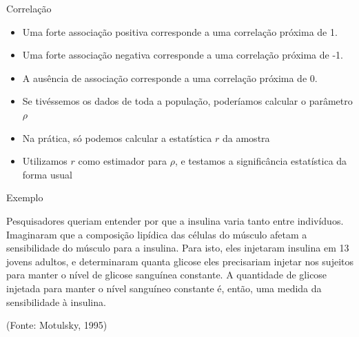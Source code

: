 \documentclass{beamer}
\begin{document}
\begin{frame}{Correlação}
  \begin{block}{}
    \begin{itemize}
    \item Uma forte associação \alert<2>{positiva} corresponde a uma correlação
      próxima de \alert<2>{1}.
    \item Uma forte associação \alert<3>{negativa} corresponde a uma correlação
      próxima de \alert<3>{-1}.
    \item A \alert<4>{ausência} de associação corresponde a uma
      correlação próxima de \alert<4>{0}.
    \end{itemize}
  \end{block}
\end{frame}

\begin{frame}{}
  \begin{itemize}
  \item Se tivéssemos os dados de toda a \alert<1>{população}, poderíamos
    calcular o \alert<1>{parâmetro} $\rho$
  \item Na prática, só podemos calcular a \alert<2>{estatística} $r$ da \alert<2>{amostra}
  \item Utilizamos $r$ como estimador para $\rho$, e testamos a
    significância estatística da forma usual
  \end{itemize}
\end{frame}

\begin{frame}{Exemplo}
 \begin{example}
   Pesquisadores queriam entender por que a insulina varia tanto entre
   indivíduos. Imaginaram que a \alert<2>{composição lipídica} das células do
   músculo afetam a \alert<3>{sensibilidade do músculo para a insulina}. Para
   isto, eles injetaram insulina em 13 jovens adultos, e determinaram
   quanta glicose eles precisariam injetar nos sujeitos para manter o
   nível de glicose sanguínea constante. A quantidade de glicose
   injetada para manter o nível sanguíneo constante é, então, uma
   medida da sensibilidade à insulina.


    (Fonte: Motulsky, 1995)
  \end{example}
\end{frame}
\end{document}
